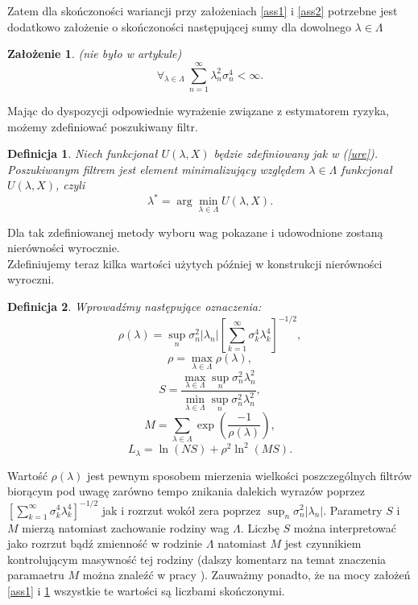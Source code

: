 \documentclass{article}
\newtheorem{df}{Definicja}
\newtheorem{za}{Założenie}
\begin{document}
Zatem dla skończoności wariancji przy założeniach \ref{ass1} i \ref{ass2} potrzebne jest dodatkowo założenie o skończoności następującej sumy dla dowolnego $\lambda\in \Lambda$
\begin{za}\label{ass3}
(nie było w artykule)
\begin{displaymath}
\forall_{\lambda\in \Lambda}\ \sum_{n=1}^{\infty}\lambda_n^2\sigma_n^4<\infty.
\end{displaymath}
\end{za}
Mając do dyspozycji odpowiednie wyrażenie związane z estymatorem ryzyka, możemy zdefiniować poszukiwany filtr.
\begin{df}
Niech funkcjonał $U(\lambda,X)$ będzie zdefiniowany jak w (\ref{ure}). Poszukiwanym filtrem jest element minimalizujący względem $\lambda\in \Lambda$ funkcjonał $U(\lambda,X)$, czyli
\begin{equation}\label{estimator}
\lambda^*=\arg\min_{\lambda\in \Lambda}U(\lambda,X).
\end{equation}
\end{df}
Dla tak zdefiniowanej metody wyboru wag pokazane i udowodnione zostaną nierówności wyrocznie.\\
Zdefiniujemy teraz kilka wartości użytych później w konstrukcji nierówności wyroczni.
\begin{df}
Wprowadźmy następujące oznaczenia:
\begin{displaymath}
\rho(\lambda)=\sup_n\sigma_n^2|\lambda_n|\left[\sum_{k=1}^{\infty}\sigma_k^4\lambda_k^4\right]^{-1/2},
\end{displaymath}
\begin{displaymath}
\rho=\max_{\lambda\in \Lambda}\rho(\lambda),
\end{displaymath}
\begin{displaymath}
S=\frac{\max_{\lambda\in\Lambda}\sup_n\sigma_n^2\lambda_n^2}{\min_{\lambda\in \Lambda}\sup_n\sigma_n^2\lambda_n^2},
\end{displaymath}
\begin{displaymath}
M=\sum_{\lambda\in \Lambda}\exp\left(\frac{-1}{\rho(\lambda)}\right),
\end{displaymath}
\begin{displaymath}
L_{\lambda}=\ln(NS)+\rho^2\ln^2(MS).
\end{displaymath}
\end{df}
Wartość $\rho(\lambda)$ jest pewnym sposobem mierzenia wielkości poszczególnych filtrów biorącym pod uwagę zarówno tempo znikania dalekich wyrazów poprzez $\left[\sum_{k=1}^{\infty}\sigma_k^4\lambda_k^4\right]^{-1/2}$ jak i rozrzut wokół zera poprzez $\sup_n\sigma_n^2|\lambda_n|$. Parametry $S$ i $M$ mierzą natomiast zachowanie rodziny wag $\Lambda$. Liczbę $S$ można interpretować jako rozrzut bądź zmienność w rodzinie $\Lambda$ natomiast $M$ jest czynnikiem kontrolującym masywność tej rodziny (dalszy komentarz na temat znaczenia paramaetru $M$ można znaleźć w pracy \cite{birge}). Zauważmy ponadto, że na mocy założeń \ref{ass1} i \ref{ass3} wszystkie te wartości są liczbami skończonymi.\\
\end{document}
